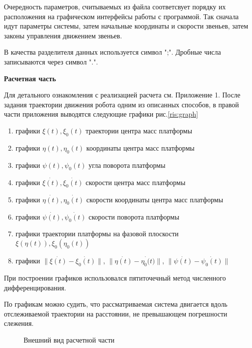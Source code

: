 Очередность параметров, считываемых из файла соответсвует порядку их расположения на графическом интерфейсы работы с программой. Так сначала идут параметры системы, затем начальные координаты и скорости звеньев, затем законы управления движением звеньев.

В качества разделителя данных используется символ ";". Дробные числа записываются через символ ".".

\par
\textbf{Расчетная часть}

Для детального ознакомления с реализацией расчета см. Приложение 1.
После задания траектории движения робота одним из описанных способов, в правой части приложения выводятся следующие графики рис.\eqref{ris:graph}

\begin{enumerate}
\item{ графики  $\xi(t), \xi_0(t)$ траектории центра масс платформы }
\item{ графики  $\eta(t), \eta_0(t)$ координаты  центра масс платформы }
\item{ графики  $\psi(t), \psi_0(t)$ угла поворота платформы  }
\item{ графики  $\dot{\xi(t)}, \dot{\xi_0(t)}$ скорости центра масс платформы }
\item{ графики  $\dot{\eta(t)}, \dot{\eta_0(t)}$ скорости координаты  центра масс платформы }
\item{ графики  $\dot{\psi(t)}, \dot{\psi_0(t)}$ скорости поворота платформы  }
\item{ графики траектории платформы  на фазовой плоскости $\xi(\eta(t)), \xi_0(\eta_0(t))$}
\item{ графики  $\|\dot{\xi(t)} - \dot{\xi_0(t)}\|$, $\|\dot{\eta(t)} - \dot{\eta_0(t})\|$, 
$\|\dot{\psi(t)} - \dot{\psi_0(t)}\|$  }
\end{enumerate}
При построении графиков  использовался пятиточечный метод численного дифференцирования.

По графикам можно судить, что рассматриваемая система двигается вдоль отслеживаемой траектории на расстоянии, не превышающем погрешности слежения.

\begin{figure}[h]
\caption{Внешний вид расчетной части}
\label{ris:graph}
\end{figure}



